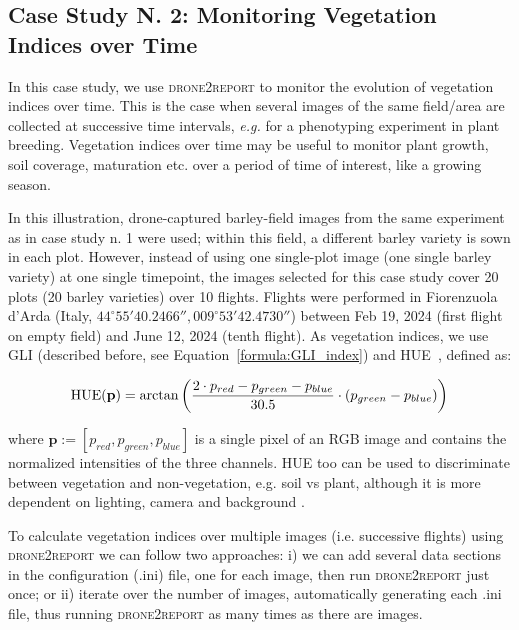 \documentclass[drones,technicalnote,accept,pdftex,moreauthors]{Definitions/mdpi}
\begin{document}
\subsection{Case Study N. 2: Monitoring Vegetation Indices over Time}

In this case study, we use \textsc{drone2report} to monitor the evolution of vegetation indices over time. This is the case when several images of the same field/area are collected at successive time intervals, \textit{e.g.} for a phenotyping experiment in plant breeding.
Vegetation indices over time may be useful to monitor plant growth, soil coverage, maturation etc. over a period of time of interest, like a growing season.

In this illustration, drone-captured barley-field images from the same experiment as in case study n. 1 were used; within this field, a different barley variety is sown in each plot.
However, instead of using one single-plot image (one single barley variety) at one single timepoint, the images selected for this case study cover 20 plots (20 barley varieties) over 10 flights. Flights were performed in Fiorenzuola d'Arda 
(Italy, $44^\circ 55'40.2466'', 009^\circ53'42.4730''$)
between Feb 19, 2024 (first flight on empty field) and June 12, 2024 (tenth flight).
As vegetation indices, we use GLI (described before, see Equation~\ref{formula:GLI_index}) and HUE~\cite{mathieu1998relationships}, defined as:

\begin{equation}
\label{formula:HUE}
\text{HUE(\textbf{p})} = \text{arctan} \left( \frac{2 \cdot p_{red} - p_{green} - p_{blue}}{30.5} \cdot (p_{green} - p_{blue}) \right)
\end{equation}

where $\textbf{p} := [p_{red}, p_{green}, p_{blue}]$ is a single pixel of an RGB image and contains the normalized intensities of the three channels.
HUE too can be used to discriminate between vegetation and non-vegetation, e.g. soil vs plant, although it is more dependent on lighting, camera and background \cite{meyer2008verification}.

To calculate vegetation indices over multiple images (i.e. successive flights) using \textsc{drone2report} we can follow two approaches: i) we can add several data sections in the configuration (.ini) file, one for each image, then run \textsc{drone2report} just once; or ii) iterate over the number of images, automatically generating each .ini file, thus running \textsc{drone2report} as many times as there are images.
\end{document}
